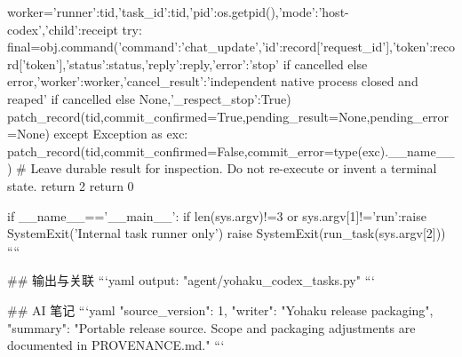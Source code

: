     worker={'runner':tid,'task_id':tid,'pid':os.getpid(),'mode':'host-codex','child':receipt}
    try:
        final=obj.command({'command':'chat_update','id':record['request_id'],'token':record['token'],'status':status,'reply':reply,'error':'stop' if cancelled else error,'worker':worker,'cancel_result':'independent native process closed and reaped' if cancelled else None,'_respect_stop':True})
        patch_record(tid,commit_confirmed=True,pending_result=None,pending_error=None)
    except Exception as exc:
        patch_record(tid,commit_confirmed=False,commit_error=type(exc).__name__)
        # Leave durable result for inspection. Do not re-execute or invent a terminal state.
        return 2
    return 0


if __name__=='__main__':
    if len(sys.argv)!=3 or sys.argv[1]!='run':raise SystemExit('Internal task runner only')
    raise SystemExit(run_task(sys.argv[2]))
````

## 输出与关联
```yaml
output: "agent/yohaku_codex_tasks.py"
```

## AI 笔记
```yaml
{"source_version": 1, "writer": "Yohaku release packaging", "summary": "Portable release source. Scope and packaging adjustments are documented in PROVENANCE.md."}
```
